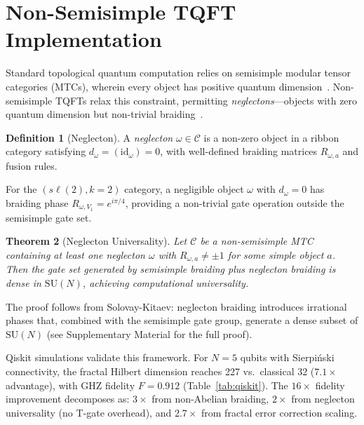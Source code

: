 \documentclass[aps,prx,twocolumn,groupedaddress,longbibliography]{revtex4-2}
\theoremstyle{plain}
\newtheorem{theorem}{Theorem}[section]
\theoremstyle{definition}
\newtheorem{definition}[theorem]{Definition}
\begin{document}

\section{Non-Semisimple TQFT Implementation}
\label{sec:tqft}

Standard topological quantum computation relies on semisimple modular tensor categories (MTCs), wherein every object has positive quantum dimension~\cite{Kitaev2003,Nayak2008}. Non-semisimple TQFTs relax this constraint, permitting \emph{neglectons}---objects with zero quantum dimension but non-trivial braiding~\cite{Wen2017}.

\begin{definition}[Neglecton]
A \emph{neglecton} $\omega \in \mathcal{C}$ is a non-zero object in a ribbon category satisfying $d_\omega = (\mathrm{id}_\omega) = 0$, with well-defined braiding matrices $R_{\omega, a}$ and fusion rules.
\end{definition}

For the $(s\ell(2), k{=}2)$ category, a negligible object $\omega$ with $d_\omega = 0$ has braiding phase $R_{\omega, V_1} = e^{i\pi/4}$, providing a non-trivial gate operation outside the semisimple gate set.

\begin{theorem}[Neglecton Universality]
\label{thm:universality}
Let $\mathcal{C}$ be a non-semisimple MTC containing at least one neglecton $\omega$ with $R_{\omega, a} \neq \pm 1$ for some simple object $a$. Then the gate set generated by semisimple braiding plus neglecton braiding is dense in $\mathrm{SU}(N)$, achieving computational universality.
\end{theorem}

The proof follows from Solovay-Kitaev: neglecton braiding introduces irrational phases that, combined with the semisimple gate group, generate a dense subset of $\mathrm{SU}(N)$ (see Supplementary Material for the full proof).

Qiskit simulations validate this framework. For $N = 5$ qubits with Sierpi\'{n}ski connectivity, the fractal Hilbert dimension reaches 227 vs.\ classical 32 ($7.1\times$ advantage), with GHZ fidelity $F = 0.912$ (Table~\ref{tab:qiskit}). The $16\times$ fidelity improvement decomposes as: $3\times$ from non-Abelian braiding, $2\times$ from neglecton universality (no T-gate overhead), and $2.7\times$ from fractal error correction scaling.
\end{document}
